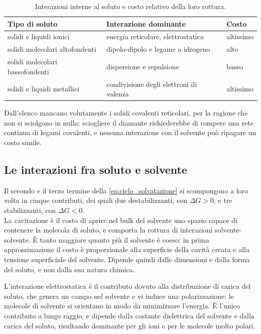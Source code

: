 \begin{table}[htbp]
    \centering
    \begin{tabular}{lll}
        \toprule
        Tipo di soluto & Interazione dominante & Costo \\
        \midrule
        solidi e liquidi ionici     & energia reticolare, elettrostatica & altissimo \\
        solidi molecolari altofondenti & dipolo-dipolo e legame a idrogeno & alto \\
        solidi molecolari bassofondenti & dispersione e repulsione & basso \\
        solidi e liquidi metallici  & condivisione degli elettroni di valenza & altissimo \\
        \bottomrule
    \end{tabular}
    \caption{Interazioni interne al soluto e costo relativo della loro rottura.}
    \label{tab:interazioni_soluto}
\end{table}

Dall'elenco mancano volutamente i solidi covalenti reticolari, per la ragione che non si sciolgono in nulla: sciogliere il diamante richiederebbe di rompere una rete continua di legami covalenti, e nessuna interazione con il solvente può ripagare un costo simile.

\subsection{Le interazioni fra soluto e solvente}

Il secondo e il terzo termine della \eqref{eq:ciclo_solvatazione} si scompongono a loro volta in cinque contributi, dei quali due destabilizzanti, con $\Delta G > 0$, e tre stabilizzanti, con $\Delta G < 0$.\\

La cavitazione è il costo di aprire nel bulk del solvente uno spazio capace di contenere la molecola di soluto, e comporta la rottura di interazioni solvente-solvente.
È tanto maggiore quanto più il solvente è coeso: in prima approssimazione il costo è proporzionale alla superficie della cavità creata e alla tensione superficiale del solvente.
Dipende quindi dalle dimensioni e dalla forma del soluto, e non dalla sua natura chimica.\\

\newpage

L'interazione elettrostatica è il contributo dovuto alla distribuzione di carica del soluto, che genera un campo nel solvente e vi induce una polarizzazione: le molecole di solvente si orientano in modo da minimizzare l'energia.
È l'unico contributo a lungo raggio, e dipende dalla costante dielettrica del solvente e dalla carica del soluto, risultando dominante per gli ioni e per le molecole molto polari.\\

